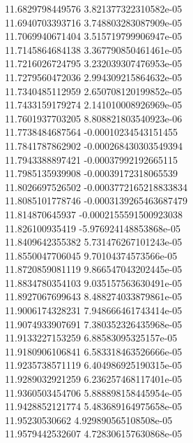 {11.6829798449576 3.821377322310582e-05 \\
11.6940703393716 3.748803283087909e-05 \\
11.7069940671404 3.515719799906947e-05 \\
11.7145864684138 3.367790850461461e-05 \\
11.7216026724795 3.232039307476953e-05 \\
11.7279560472036 2.994309215864632e-05 \\
11.7340485112959 2.650708120199852e-05 \\
11.7433159179274 2.141010008926969e-05 \\
11.7601937703205 8.808821803540923e-06 \\
11.7738484687564 -0.00010234543151455 \\
11.7841787862902 -0.000268430303549394 \\
11.7943388897421 -0.00037992192665115 \\
11.7985135939908 -0.00039172318065539 \\
11.8026697526502 -0.0003772165218833834 \\
11.8085101778746 -0.0003139265463687479 \\
11.814870645937 -0.0002155591500923038 \\
11.826100935419 -5.976924148853868e-05 \\
11.8409642355382 5.731476267101243e-05 \\
11.8550047706045 9.70104374573566e-05 \\
11.8720859081119 9.866547043202445e-05 \\
11.8834780354103 9.035157563630491e-05 \\
11.8927067699643 8.488274033879861e-05 \\
11.9006174328231 7.948666461743414e-05 \\
11.9074933907691 7.380352326435968e-05 \\
11.9133227153259 6.88583095325157e-05 \\
11.9180906106841 6.583318463526666e-05 \\
11.9235738571119 6.404986925190315e-05 \\
11.9289032921259 6.236257468117401e-05 \\
11.9360503454706 5.888898158445954e-05 \\
11.9428852121774 5.483689164975658e-05 \\
11.95230530662 4.929890565108508e-05 \\
11.9579442532607 4.728306157630868e-05 \\
}
